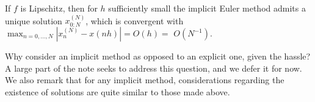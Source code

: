 \begin{theorem}
\label{thm: First order convergence of implicit Euler}
If $f$ is Lipschitz, then for $h$ sufficiently small the implicit Euler method admits a unique solution $x_{0: N}^{(N)}$, which is convergent with $\max _{n=0, \ldots, N}\left|x_n^{(N)}-x(n h)\right|=O(h)=$ $O\left(N^{-1}\right)$.
\end{theorem}
Why consider an implicit method as opposed to an explicit one, given the hassle? A large part of the note seeks to address this question, and we defer it for now. We also remark that for any implicit method, considerations regarding the existence of solutions are quite similar to those made above.